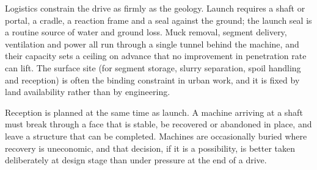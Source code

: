 Logistics constrain the drive as firmly as the geology. Launch requires a
shaft or portal, a cradle, a reaction frame and a seal against the ground; the
launch seal is a routine source of water and ground loss. Muck removal, segment
delivery, ventilation and power all run through a single tunnel behind the
machine, and their capacity sets a ceiling on advance that no improvement in
penetration rate can lift. The surface site (for segment storage, slurry
separation, spoil handling and reception) is often the binding constraint in
urban work, and it is fixed by land availability rather than by engineering.

Reception is planned at the same time as launch. A machine arriving at a shaft
must break through a face that is stable, be recovered or abandoned in place,
and leave a structure that can be completed. Machines are occasionally buried
where recovery is uneconomic, and that decision, if it is a possibility, is
better taken deliberately at design stage than under pressure at the end of a
drive.

\chapterreferences
